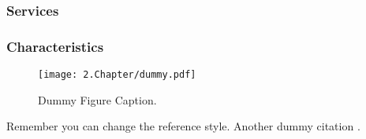 \subsubsection{Services}
\label{subsec:services}

\subsubsection{Characteristics}
\label{subsec:Charac}

\begin{figure}[H]
	\centering
		\texttt{[image: 2.Chapter/dummy.pdf]}
	\caption[Dummy Figure Caption for List of Figures.]{Dummy Figure Caption.}
	\label{fig:dummyfigure1}
\end{figure}

Remember you can change the reference style. Another dummy citation \cite{site}.
